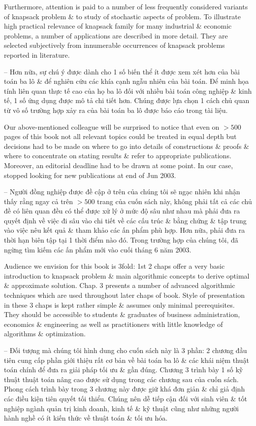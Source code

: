 \documentclass{article}
\begin{document}
\begin{itemize}
    Furthermore, attention is paid to a number of less frequently considered variants of knapsack problem \& to study of stochastic aspects of problem. To illustrate high practical relevance of knapsack family for many industrial \& economic problems, a number of applications are described in more detail. They are selected subjectively from innumerable occurrences of knapsack problems reported in literature.

    -- Hơn nữa, sự chú ý được dành cho 1 số biến thể ít được xem xét hơn của bài toán ba lô \& để nghiên cứu các khía cạnh ngẫu nhiên của bài toán. Để minh họa tính liên quan thực tế cao của họ ba lô đối với nhiều bài toán công nghiệp \& kinh tế, 1 số ứng dụng được mô tả chi tiết hơn. Chúng được lựa chọn 1 cách chủ quan từ vô số trường hợp xảy ra của bài toán ba lô được báo cáo trong tài liệu.

    Our above-mentioned colleague will be surprised to notice that even on $> 500$ pages of this book not all relevant topics could be treated in equal depth but decisions had to be made on where to go into details of constructions \& proofs \& where to concentrate on stating results \& refer to appropriate publications. Moreover, an editorial deadline had to be drawn at some point. In our case, stopped looking for new publications at end of Jun 2003.

    -- Người đồng nghiệp được đề cập ở trên của chúng tôi sẽ ngạc nhiên khi nhận thấy rằng ngay cả trên $> 500$ trang của cuốn sách này, không phải tất cả các chủ đề có liên quan đều có thể được xử lý ở mức độ sâu như nhau mà phải đưa ra quyết định về việc đi sâu vào chi tiết về các cấu trúc \& bằng chứng \& tập trung vào việc nêu kết quả \& tham khảo các ấn phẩm phù hợp. Hơn nữa, phải đưa ra thời hạn biên tập tại 1 thời điểm nào đó. Trong trường hợp của chúng tôi, đã ngừng tìm kiếm các ấn phẩm mới vào cuối tháng 6 năm 2003.

    Audience we envision for this book is 3fold: 1st 2 chaps offer a very basic introduction to knapsack problem \& main algorithmic concepts to derive optimal \& approximate solution. Chap. 3 presents a number of advanced algorithmic techniques which are used throughout later chaps of book. Style of presentation in these 3 chaps is kept rather simple \& assumes only minimal prerequisites. They should be accessible to students \& graduates of business administration, economics \& engineering as well as practitioners with little knowledge of algorithms \& optimization.

    -- Đối tượng mà chúng tôi hình dung cho cuốn sách này là 3 phần: 2 chương đầu tiên cung cấp phần giới thiệu rất cơ bản về bài toán ba lô \& các khái niệm thuật toán chính để đưa ra giải pháp tối ưu \& gần đúng. Chương 3 trình bày 1 số kỹ thuật thuật toán nâng cao được sử dụng trong các chương sau của cuốn sách. Phong cách trình bày trong 3 chương này được giữ khá đơn giản \& chỉ giả định các điều kiện tiên quyết tối thiểu. Chúng nên dễ tiếp cận đối với sinh viên \& tốt nghiệp ngành quản trị kinh doanh, kinh tế \& kỹ thuật cũng như những người hành nghề có ít kiến thức về thuật toán \& tối ưu hóa.


\end{itemize}
\end{document}
